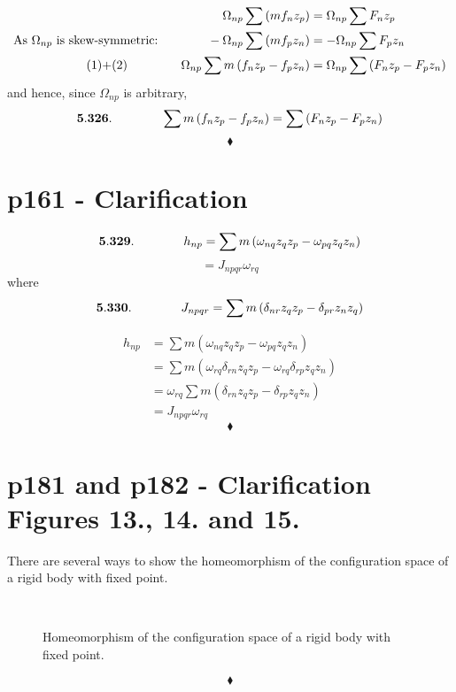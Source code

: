 \begin{align}
\Omega_{np}\sum \left(mf_nz_p\right)&= \Omega_{np}\sum F_nz_p \\
\text{As }\Omega_{np}\text{ is skew-symmetric:}\quad\quad\quad\quad -\Omega_{np}\sum \left(mf_pz_n\right)&= -\Omega_{np}\sum F_pz_n \\
\text{(1)+(2) }\quad\quad\quad\quad \Omega_{np}\sum m\left(f_nz_p-f_pz_n\right)&= \Omega_{np}\sum\left( F_nz_p -F_pz_n\right)
\end{align}
and hence, since $\Omega_{np}$ is arbitrary,
$$\mathbf{5.326.}\quad\quad\quad\quad \sum m\left(f_nz_p-f_pz_n\right)= \sum \left(F_nz_p-F_pz_n \right)$$
$$\blacklozenge$$
\newpage

\section{p161 - Clarification}
\begin{tcolorbox}
$$\mathbf{5.329.}\quad\quad\quad\quad h_{np}=\sum m\left(\omega_{nq} z_q z_p -\omega_{pq} z_qz_n\right)$$
$$= J_{npqr}\omega_{rq}$$
where
$$\mathbf{5.330.}\quad\quad\quad\quad J_{npqr}= \sum m\left(\delta_{nr}z_qz_p-\delta_{pr}z_nz_q \right)$$
\end{tcolorbox}
\begin{align}
h_{np}&=\sum m\left(\omega_{nq} z_q z_p -\omega_{pq} z_qz_n\right)\\
&=\sum m\left(\omega_{rq}\delta_{rn} z_q z_p -\omega_{rq} \delta_{rp}z_qz_n\right)\\
&=\omega_{rq}\sum m\left(\delta_{rn} z_q z_p -\delta_{rp}z_qz_n\right)\\
&=J_{npqr}\omega_{rq}
\end{align}
$$\blacklozenge$$
\newpage


\section{p181 and p182 - Clarification Figures 13., 14. and 15.}
\begin{tcolorbox}
There are several ways to show the homeomorphism of the configuration space of a rigid body with fixed point.
\end{tcolorbox}
\begin{figure}[H]
    \centering
    \subfloat[]{}
	\
    \subfloat[]{}
    \qquad
    \subfloat[]{}
\caption{Homeomorphism of the configuration space of a rigid body with fixed point.}
\label{fig:fig_p181}
\end{figure}
$$\blacklozenge$$
\newpage